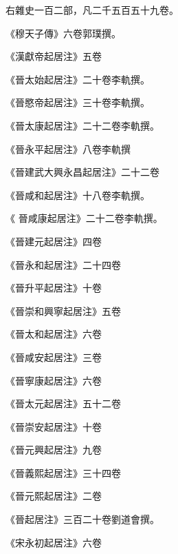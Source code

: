 \begin{pinyinscope}
 右雜史一百二部，凡二千五百五十九卷。



 《穆天子傳》六卷郭璞撰。



 《漢獻帝起居注》五卷



 《晉太始起居注》二十卷李軌撰。



 《晉愍帝起居注》三十卷李軌撰。



 《晉太康起居注》二十二卷李軌撰。



 《晉永平起居注》八卷李軌撰



 《晉建武大興永昌起居注》二十二卷



 《晉咸和起居注》十八卷李軌撰。



 《
 晉咸康起居注》二十二卷李軌撰。



 《晉建元起居注》四卷



 《晉永和起居注》二十四卷



 《晉升平起居注》十卷



 《晉崇和興寧起居注》五卷



 《晉太和起居注》六卷



 《晉咸安起居注》三卷



 《晉寧康起居注》六卷



 《晉太元起居注》五十二卷



 《晉崇安起居注》十卷



 《晉元興起居注》九卷



 《晉義熙起居注》三十四卷



 《晉元熙起居注》二卷



 《晉起居注》三百二十卷劉道會撰。



 《宋永初起居注》六卷




\end{pinyinscope}
